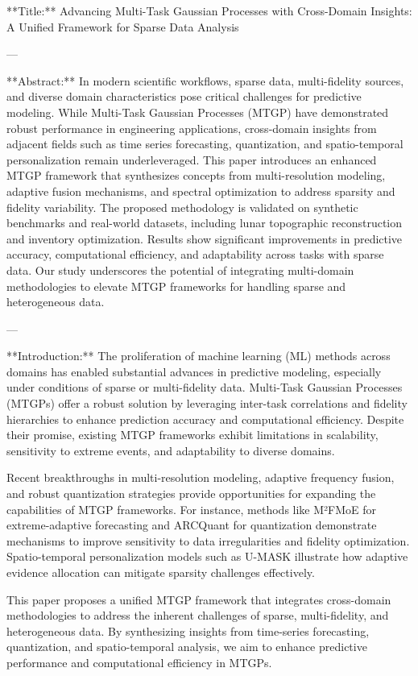 **Title:**  
Advancing Multi-Task Gaussian Processes with Cross-Domain Insights: A Unified Framework for Sparse Data Analysis  

---

**Abstract:**  
In modern scientific workflows, sparse data, multi-fidelity sources, and diverse domain characteristics pose critical challenges for predictive modeling. While Multi-Task Gaussian Processes (MTGP) have demonstrated robust performance in engineering applications, cross-domain insights from adjacent fields such as time series forecasting, quantization, and spatio-temporal personalization remain underleveraged. This paper introduces an enhanced MTGP framework that synthesizes concepts from multi-resolution modeling, adaptive fusion mechanisms, and spectral optimization to address sparsity and fidelity variability. The proposed methodology is validated on synthetic benchmarks and real-world datasets, including lunar topographic reconstruction and inventory optimization. Results show significant improvements in predictive accuracy, computational efficiency, and adaptability across tasks with sparse data. Our study underscores the potential of integrating multi-domain methodologies to elevate MTGP frameworks for handling sparse and heterogeneous data.  

---

**Introduction:**  
The proliferation of machine learning (ML) methods across domains has enabled substantial advances in predictive modeling, especially under conditions of sparse or multi-fidelity data. Multi-Task Gaussian Processes (MTGPs) offer a robust solution by leveraging inter-task correlations and fidelity hierarchies to enhance prediction accuracy and computational efficiency. Despite their promise, existing MTGP frameworks exhibit limitations in scalability, sensitivity to extreme events, and adaptability to diverse domains.  

Recent breakthroughs in multi-resolution modeling, adaptive frequency fusion, and robust quantization strategies provide opportunities for expanding the capabilities of MTGP frameworks. For instance, methods like M²FMoE for extreme-adaptive forecasting and ARCQuant for quantization demonstrate mechanisms to improve sensitivity to data irregularities and fidelity optimization. Spatio-temporal personalization models such as U-MASK illustrate how adaptive evidence allocation can mitigate sparsity challenges effectively.  

This paper proposes a unified MTGP framework that integrates cross-domain methodologies to address the inherent challenges of sparse, multi-fidelity, and heterogeneous data. By synthesizing insights from time-series forecasting, quantization, and spatio-temporal analysis, we aim to enhance predictive performance and computational efficiency in MTGPs.  

